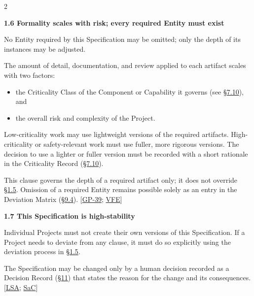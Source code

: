 \begin{multicols}{2}
\par\smallskip\noindent\textbf{1.6 Formality scales with risk; every required Entity must exist}\par\nopagebreak

No Entity required by this Specification may be omitted; only the depth of its instances may be adjusted.

The amount of detail, documentation, and review applied to each artifact scales with two factors:

\begin{itemize}\setlength{\itemsep}{0pt}\setlength{\parskip}{0pt}

\item the Criticality Class of the Component or Capability it governs (see \hyperlink{nss-7.10}{\S7.10}), and

\item the overall risk and complexity of the Project.

\end{itemize}

Low-criticality work may use lightweight versions of the required artifacts. High-criticality or safety-relevant work must use fuller, more rigorous versions. The decision to use a lighter or fuller version must be recorded with a short rationale in the Criticality Record (\hyperlink{nss-7.10}{\S7.10}).

This clause governs the depth of a required artifact only; it does not override \hyperlink{nss-1.5}{\S1.5}. Omission of a required Entity remains possible solely as an entry in the Deviation Matrix (\hyperlink{nss-9.4}{\S9.4}). [\hyperlink{gp-39}{GP-39}; \hyperlink{gp-VFE}{VFE}]

\hypertarget{nss-1.7}{}

\par\smallskip\noindent\textbf{1.7 This Specification is high-stability}\par\nopagebreak

Individual Projects must not create their own versions of this Specification. If a Project needs to deviate from any clause, it must do so explicitly using the deviation process in \hyperlink{nss-1.5}{\S1.5}.

The Specification may be changed only by a human decision recorded as a Decision Record (\hyperlink{nss-11}{\S11}) that states the reason for the change and its consequences. [\hyperlink{gp-LSA}{LSA}; \hyperlink{gp-SaC}{SaC}]

\hypertarget{nss-1.8}{}


\end{multicols}
